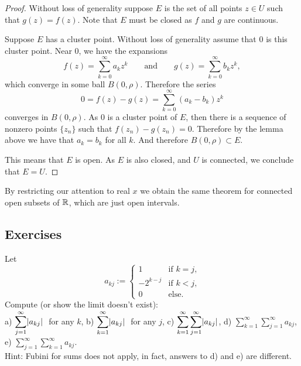 \begin{proof}
Without loss of generality suppose $E$ is the set of all points $z \in U$ such that
$g(z)=f(z)$.  Note that $E$ must be closed as $f$ and $g$ are continuous.

Suppose $E$ has a cluster point.  Without loss of generality assume that $0$
is this cluster point.  Near $0$,
we have the expansions
\begin{equation*}
f(z) = \sum_{k=0}^\infty a_k {z}^k 
\qquad
\text{and}
\qquad
g(z) = \sum_{k=0}^\infty b_k {z}^k ,
\end{equation*}
which converge in some ball $B(0,\rho)$.  Therefore the series
\begin{equation*}
0 = f(z)-g(z) = 
\sum_{k=0}^\infty (a_k-b_k) z^k
\end{equation*}
converges in $B(0,\rho)$.  As $0$ is a cluster point of $E$, then there
is a sequence of nonzero points $\{ z_n \}$ such that
$f(z_n) -g(z_n) = 0$.  Therefore by the lemma above we have
that $a_k = b_k$ for all $k$.  And therefore $B(0,\rho) \subset E$.

This means that $E$ is open.  As $E$ is also closed, and $U$ is connected, we conclude that $E = U$.
\end{proof}

By restricting our attention to real $x$ we obtain the same
theorem for connected open subsets of ${\mathbb{R}}$, which are just open intervals.

\subsection{Exercises}

\begin{exercise}
Let
\begin{equation*}
a_{kj} :=
\begin{cases}
1 & \text{if $k=j$,}\\
-2^{k-j} & \text{if $k<j$,}\\
0 & \text{else.}
\end{cases}
\end{equation*}
Compute (or show the limit doesn't exist):
\\
a) $\displaystyle \sum_{j=1}^\infty \lvert {a_{kj}} \rvert~$ for any $k$,
\hspace{\fill}
b) $\displaystyle \sum_{k=1}^\infty \lvert {a_{kj}} \rvert~$ for any $j$,
\hspace{\fill}
c)
$\displaystyle \sum_{k=1}^\infty \sum_{j=1}^\infty \lvert {a_{kj}} \rvert$,
\hspace{\fill}
d) $\displaystyle \sum_{k=1}^\infty \sum_{j=1}^\infty a_{kj}$,
\hspace{\fill}
e)
$\displaystyle \sum_{j=1}^\infty \sum_{k=1}^\infty a_{kj}$.
\\
Hint: Fubini for sums does not apply, in fact, answers to
d) and e) are different.
\end{exercise}


